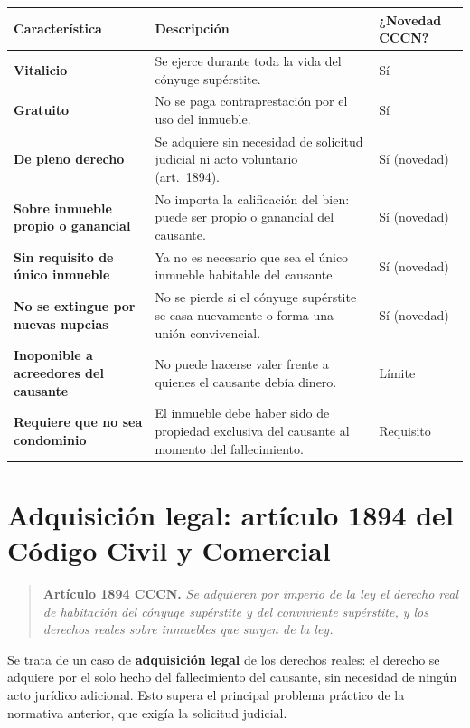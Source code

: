 \documentclass[12pt,oneside]{book}
\begin{document}
\begin{table}[H]
\centering
\begin{tabularx}{\textwidth}{
    >{\raggedright\arraybackslash}p{}
    >{\raggedright\arraybackslash}X
    >{\raggedright\arraybackslash}p{}
}
\toprule
\textbf{Característica} & \textbf{Descripción} & \textbf{¿Novedad CCCN?} \\
\midrule
\textbf{Vitalicio} & Se ejerce durante toda la vida del cónyuge supérstite. & Sí \\
\textbf{Gratuito} & No se paga contraprestación por el uso del inmueble. & Sí \\
\textbf{De pleno derecho} & Se adquiere sin necesidad de solicitud judicial ni acto voluntario (art.~1894). & Sí (novedad) \\
\textbf{Sobre inmueble propio o ganancial} & No importa la calificación del bien: puede ser propio o ganancial del causante. & Sí (novedad) \\
\textbf{Sin requisito de único inmueble} & Ya no es necesario que sea el único inmueble habitable del causante. & Sí (novedad) \\
\textbf{No se extingue por nuevas nupcias} & No se pierde si el cónyuge supérstite se casa nuevamente o forma una unión convivencial. & Sí (novedad) \\
\textbf{Inoponible a acreedores del causante} & No puede hacerse valer frente a quienes el causante debía dinero. & Límite \\
\textbf{Requiere que no sea condominio} & El inmueble debe haber sido de propiedad exclusiva del causante al momento del fallecimiento. & Requisito \\
\bottomrule
\end{tabularx}
\end{table}

\section{Adquisición legal: artículo 1894 del Código Civil y Comercial}

\begin{quote}
\textbf{Artículo 1894 CCCN.} \textit{Se adquieren por imperio de la ley el derecho real de habitación del cónyuge supérstite y del conviviente supérstite, y los derechos reales sobre inmuebles que surgen de la ley.}
\end{quote}

Se trata de un caso de \textbf{adquisición legal} de los derechos reales: el derecho se adquiere por el solo hecho del fallecimiento del causante, sin necesidad de ningún acto jurídico adicional. Esto supera el principal problema práctico de la normativa anterior, que exigía la solicitud judicial.
\end{document}
